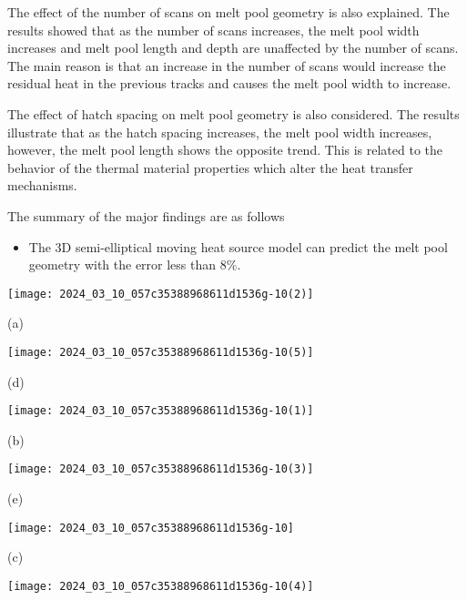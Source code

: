 \documentclass[10pt]{article}
\begin{document}
The effect of the number of scans on melt pool geometry is also explained. The results showed that as the number of scans increases, the melt pool width increases and melt pool length and depth are unaffected by the number of scans. The main reason is that an increase in the number of scans would increase the residual heat in the previous tracks and causes the melt pool width to increase.

The effect of hatch spacing on melt pool geometry is also considered. The results illustrate that as the hatch spacing increases, the melt pool width increases, however, the melt pool length shows the opposite trend. This is related to the behavior of the thermal material properties which alter the heat transfer mechanisms.

The summary of the major findings are as follows

\begin{itemize}
  \item The 3D semi-elliptical moving heat source model can predict the melt pool geometry with the error less than $8 \%$.
\end{itemize}

\begin{center}
\texttt{[image: 2024\_03\_10\_057c35388968611d1536g-10(2)]}
\end{center}

(a)

\begin{center}
\texttt{[image: 2024\_03\_10\_057c35388968611d1536g-10(5)]}
\end{center}

(d)

\begin{center}
\texttt{[image: 2024\_03\_10\_057c35388968611d1536g-10(1)]}
\end{center}

(b)

\begin{center}
\texttt{[image: 2024\_03\_10\_057c35388968611d1536g-10(3)]}
\end{center}

(e)

\begin{center}
\texttt{[image: 2024\_03\_10\_057c35388968611d1536g-10]}
\end{center}

(c)

\begin{center}
\texttt{[image: 2024\_03\_10\_057c35388968611d1536g-10(4)]}
\end{center}
\end{document}
